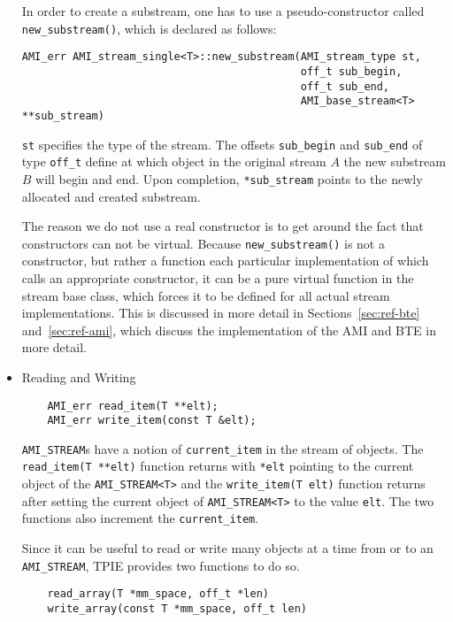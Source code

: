 \begin{itemize}
In order to create a substream, one has to use a pseudo-constructor called
\verb|new_substream()|, which is declared as follows:
\begin{verbatim}
AMI_err AMI_stream_single<T>::new_substream(AMI_stream_type st,
                                            off_t sub_begin,
                                            off_t sub_end,
                                            AMI_base_stream<T> **sub_stream)
\end{verbatim}
\verb|st| specifies the type of the stream. The offsets \verb|sub_begin| and
\verb|sub_end| of type \verb|off_t| define at which object
in the original stream $A$
the new substream $B$ will begin and end. Upon completion, \verb|*sub_stream| points to the newly allocated and created substream.

The reason we do not use a
real constructor is to get around the fact that constructors can not be
virtual. Because \verb|new_substream()| is not a constructor, but rather a
function each particular implementation of which calls an appropriate
constructor, it can be a pure virtual function in the stream base class,
which forces it to be defined for all actual stream implementations. This
is discussed in more detail in Sections~\ref{sec:ref-bte}
and~\ref{sec:ref-ami}, which discuss the implementation
of the AMI and BTE in more detail.

\item{Reading and Writing}

\begin{verbatim}
    AMI_err read_item(T **elt);
    AMI_err write_item(const T &elt);
\end{verbatim}

\verb|AMI_STREAM|s have a notion of \verb|current_item| in the stream of
objects. The \verb|read_item(T **elt)| function returns with \verb|*elt|
pointing to the current object of the \verb|AMI_STREAM<T>| and the
\verb|write_item(T elt)| function returns after setting the current object
of \verb|AMI_STREAM<T>| to the value \verb|elt|. The two functions also
increment the \verb|current_item|.

Since it can be useful to read or write many objects at a time from or to
an \verb|AMI_STREAM|, TPIE provides two functions to do so.

\begin{verbatim}
    read_array(T *mm_space, off_t *len)
    write_array(const T *mm_space, off_t len)
\end{verbatim}


\end{itemize}
